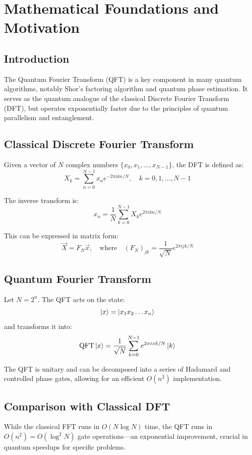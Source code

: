 \documentclass[12pt]{book}
\begin{document}
\maketitle

\chapter{Mathematical Foundations and Motivation}

\section{Introduction}
The Quantum Fourier Transform (QFT) is a key component in many quantum algorithms, notably Shor’s factoring algorithm and quantum phase estimation. It serves as the quantum analogue of the classical Discrete Fourier Transform (DFT), but operates exponentially faster due to the principles of quantum parallelism and entanglement.

\section{Classical Discrete Fourier Transform}
Given a vector of $N$ complex numbers $\{x_0, x_1, \dots, x_{N-1}\}$, the DFT is defined as:
\[
X_k = \sum_{n=0}^{N-1} x_n e^{-2\pi i kn/N}, \quad k = 0, 1, \dots, N-1
\]

The inverse transform is:
\[
x_n = \frac{1}{N} \sum_{k=0}^{N-1} X_k e^{2\pi i kn/N}
\]

This can be expressed in matrix form:
\[
\vec{X} = F_N \vec{x}, \quad \text{where} \quad (F_N)_{jk} = \frac{1}{\sqrt{N}} e^{2\pi i jk/N}
\]

\section{Quantum Fourier Transform}
Let $N = 2^n$. The QFT acts on the state:
\[
\ket{x} = \ket{x_1 x_2 \dots x_n}
\]
and transforms it into:
\[
\text{QFT} \ket{x} = \frac{1}{\sqrt{N}} \sum_{k=0}^{N-1} e^{2\pi i xk/N} \ket{k}
\]

The QFT is unitary and can be decomposed into a series of Hadamard and controlled phase gates, allowing for an efficient $O(n^2)$ implementation.

\section{Comparison with Classical DFT}
While the classical FFT runs in $O(N \log N)$ time, the QFT runs in $O(n^2) = O(\log^2 N)$ gate operations—an exponential improvement, crucial in quantum speedups for specific problems.
\end{document}
